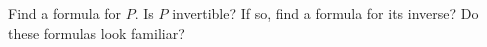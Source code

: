 \documentclass[letter]{article}
\begin{document}
\begin{enumerate}
\begin{enumerate}
					Find a formula for $P$.  Is $P$ invertible?  If so, find a formula for its inverse?  
					Do these formulas look familiar?
			\end{enumerate}
	\end{enumerate}
\end{document}
